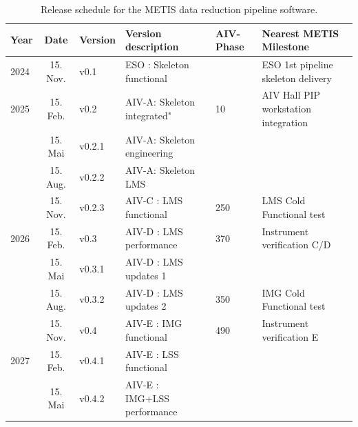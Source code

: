 \documentclass[a4paper]{spie}  %
\begin{document}
\begin{table}[]
\caption{Release schedule for the METIS data reduction pipeline software.}
\label{tab:pip_releases}
\begin{tabular}{|lcllll|}
\hline
Year & Date & Version & Version description & AIV-Phase & Nearest METIS Milestone          \\
\hline
\hline
{2024}          & 15. Nov.      & v0.1             & ESO : Skeleton functional      &                                        & ESO 1st pipeline skeleton delivery   \\
\hline
{2025}          & 15. Feb.      & v0.2             & AIV-A: Skeleton integrated"    & 10                 & AIV Hall PIP workstation integration \\
                                  & 15. Mai       & v0.2.1           & AIV-A: Skeleton engineering  &                                        &                                      \\
                                  & 15. Aug.      & v0.2.2           & AIV-A: Skeleton LMS           &                                        &                                      \\
                                  & 15. Nov.      & v0.2.3           & AIV-C : LMS functional       & {250}                & LMS Cold Functional test             \\
\hline
{2026}          & 15. Feb.      & v0.3             & AIV-D : LMS performance       & {370}                & Instrument verification C/D          \\
                                  & 15. Mai       & v0.3.1           & AIV-D : LMS updates 1         &                                        &                                      \\
                                  & 15. Aug.      & v0.3.2           & AIV-D : LMS updates 2        & {350}                & IMG Cold Functional test             \\
                                  & 15. Nov.      & v0.4             & AIV-E : IMG functional         & {490}                & Instrument verification E            \\
\hline
{2027}          & 15. Feb.      & v0.4.1           & AIV-E : LSS functional      &                                        &                                      \\
                                  & 15. Mai       & v0.4.2           & AIV-E : IMG+LSS performance   &                                        &                                      \\

\end{tabular}
\end{table}
\end{document}
